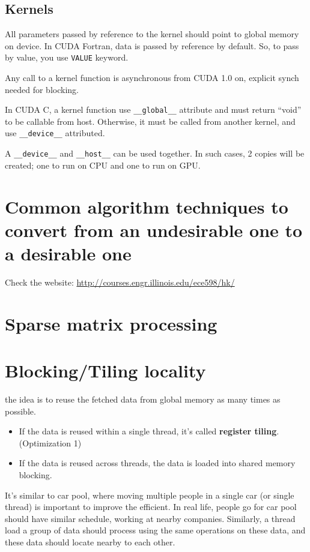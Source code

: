 \subsection{Kernels}
\label{sec:kernels}

All parameters passed by reference to the kernel should point to
global memory on device. In CUDA Fortran, data is passed by reference
by default. So, to pass by value, you use \verb!VALUE! keyword. 


Any call to a kernel function is asynchronous from CUDA 1.0 on,
explicit synch needed for blocking.

In CUDA C, a kernel function use \verb!__global__! attribute and must
return ``void'' to be callable from host. Otherwise, it must be called
from another kernel, and use \verb!__device__! attributed.


A \verb!__device__! and \verb!__host__! can be used together. In such
cases, 2 copies will be created; one to run on CPU and one to run on
GPU.






\section{Common algorithm techniques to convert from an undesirable one to a desirable one}
\label{sec:comm-algor-techn}

Check the website: 
\url{http://courses.engr.illinois.edu/ece598/hk/}

\section{Sparse matrix processing}
\label{sec:sparse-matr-proc}

\section{Blocking/Tiling locality}
\label{sec:block-local}

the idea is to reuse the fetched data from global memory as many times
as possible. 
\begin{itemize}
\item If the data is reused within a single thread, it's called {\bf
    register tiling}. (Optimization 1)
\item If the data is reused across threads, the data is loaded into
  shared memory blocking. 
\end{itemize}
It's similar to car pool, where moving multiple people in a single car
(or single thread) is important to improve the efficient. In real
life, people go for car pool should have similar schedule, working at
nearby companies. Similarly, a thread load a group of data should
process using the same operations on these data, and these data should
locate nearby to each other. 

